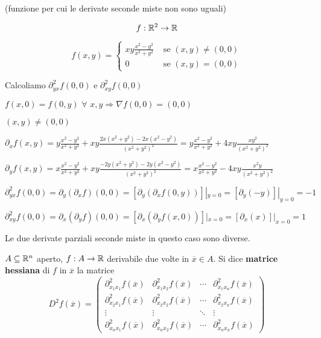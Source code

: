 \begin{exbar}
\begin{example}
	(funzione per cui le derivate seconde miste non sono uguali)
	
	$$f:\mathbb{R}^2\rightarrow\mathbb{R}$$
	
	\begin{equation*}
		f(x,y)=
		\begin{cases}
			xy\frac{x^2-y^2}{x^2+y^2}&\text{  se  }(x,y)\neq (0,0)
			\\
			0&\text{  se  }(x,y)=(0,0)
		\end{cases}
	\end{equation*}
	
	Calcoliamo $\partial_{yx}^2f(0,0)$ e $\partial_{xy}^2f(0,0)$
	
	$f(x,0)=f(0,y)\,\, \forall\,\, x,y \Rightarrow \nabla f(0,0)=(0,0)$
	
	$(x,y)\neq (0,0)$
	
	$\partial_x f(x,y)=y \frac{x^2-y^2}{x^2+y^2}+xy\frac{2x(x^2+y^2)-2x(x^2-y^2)}{(x^2+y^2)^2}= y \frac{x^2-y^2}{x^2+y^2}+4xy\frac{xy^2}{(x^2+y^2)^2}$
	
	$\partial_yf(x,y)=x\frac{x^2-y^2}{x^2+y^2}+xy\frac{-2y(x^2+y^2)-2y(x^2-y^2)}{(x^2+y^2)^2}=x\frac{x^2-y^2}{x^2+y^2}-4xy\frac{x^2y}{(x^2+y^2)^2}$
	
	$\partial_{yx}^2f(0,0)=\partial_y (\partial_x f)(0,0)=[\partial_y(\partial_xf(0,y))]|_{y=0}=[\partial_y(-y)]|_{y=0}=-1$
	
	$\partial_{xy}^2f(0,0)=\partial_x(\partial_yf)(0,0)= [\partial_x(\partial_yf(x,0))]|_{x=0}=[\partial_x(x)]|_{x=0}=1$
	
	Le due derivate parziali seconde miste in questo caso sono diverse.
\end{example}
\end{exbar}


\begin{definition}
	$A \subseteq \mathbb{R}^n$ aperto, $f: A \rightarrow \mathbb{R}$ derivabile due volte in $\overline{x}\in A$. Si dice \textbf{matrice hessiana} di $f$ in $\overline{x}$ la matrice
	\begin{equation*}
		D^2f(\overline{x})=
		\begin{pmatrix}
			\partial_{x_1x_1}^2f(\overline{x})& \partial_{x_1x_2}^2f(\overline{x})  & \cdots & \partial_{x_1x_n}^2f(\overline{x})
			\\
			\partial_{x_2x_1}^2f(\overline{x})& \partial_{x_2x_2}^2f(\overline{x}) & \cdots & \partial_{x_2x_n}^2f(\overline{x})
			\\
			\vdots&\vdots & \ddots &\vdots 
			\\
			\partial_{x_nx_1}^2f(\overline{x})& \partial_{x_nx_2}^2f(\overline{x})& \cdots & \partial_{x_nx_n}^2f(\overline{x}) 
		\end{pmatrix}
	\end{equation*}
\end{definition}


